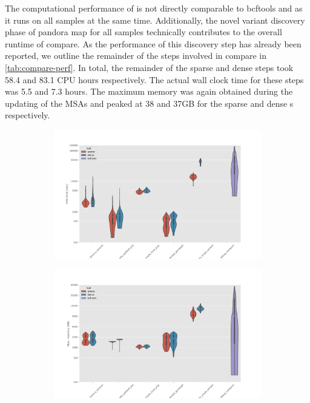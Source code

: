 The computational performance of \pandora{}  is not directly comparable to bcftools and \pandora{}  as it runs on all samples at the same time. Additionally, the novel variant discovery phase of pandora map for all samples technically contributes to the overall runtime of compare. As the performance of this discovery step has already been reported, we outline the remainder of the steps involved in compare in \autoref{tab:compare-perf}. In total, the remainder of the sparse and dense \prg{} steps took 58.4 and 83.1 CPU hours respectively. The actual wall clock time for these steps was 5.5 and 7.3 hours. The maximum memory was again obtained during the updating of the MSAs and peaked at 38 and 37GB for the sparse and dense \prg{}s respectively.

\begin{figure}
     \centering
     \begin{subfigure}[b]{0.475\textwidth}
         \centering
         \includegraphics[width=\textwidth]{Chapter2/Figs/cpu_time.png}
         \caption{}
         \label{fig:cpu-time}
     \end{subfigure}
     \begin{subfigure}[b]{0.475\textwidth}
         \centering
         \includegraphics[width=\textwidth]{Chapter2/Figs/max_mem.png}

\end{subfigure}
\end{figure}
